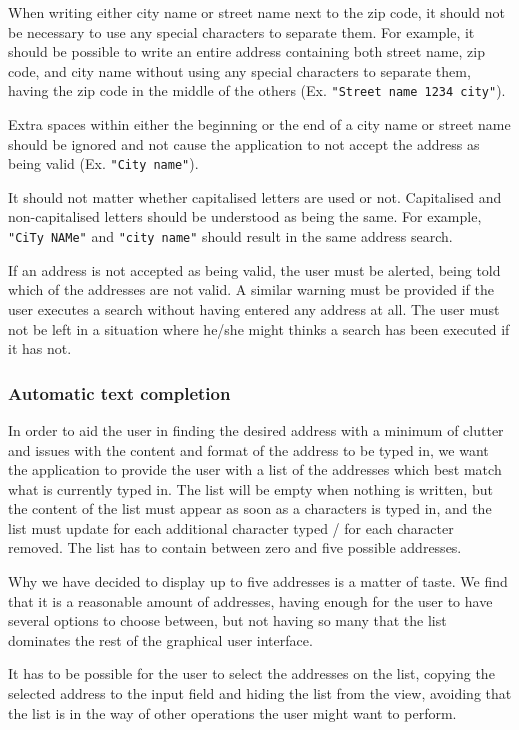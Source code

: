 When writing either city name or street name next to the zip code, it should not be necessary to use any special characters to separate them. For example, it should be possible to write an entire address containing both street name, zip code, and city name without using any special characters to separate them, having the zip code in the middle of the others (Ex. \texttt{"Street name 1234 city"}).

Extra spaces within either the beginning or the end of a city name or street name should be ignored and not cause the application to not accept the address as being valid (Ex. \texttt{"City    name"}).

It should not matter whether capitalised letters are used or not. Capitalised and non-capitalised letters should be understood as being the same. For example, \texttt{"CiTy NAMe"} and \texttt{"city name"} should result in the same address search.

If an address is not accepted as being valid, the user must be alerted, being told which of the addresses are not valid. A similar warning must be provided if the user executes a search without having entered any address at all. The user must not be left in a situation where he/she might thinks a search has been executed if it has not.

\subsubsection{Automatic text completion}
In order to aid the user in finding the desired address with a minimum of clutter and issues with the content and format of the address to be typed in, we want the application to provide the user with a list of the addresses which best match what is currently typed in. The list will be empty when nothing is written, but the content of the list must appear as soon as a characters is typed in, and the list must update for each additional character typed / for each character removed. The list has to contain between zero and five possible addresses.

Why we have decided to display up to five addresses is a matter of taste. We find that it is a reasonable amount of addresses, having enough for the user to have several options to choose between, but not having so many that the list dominates the rest of the graphical user interface.

It has to be possible for the user to select the addresses on the list, copying the selected address to the input field and hiding the list from the view, avoiding that the list is in the way of other operations the user might want to perform.